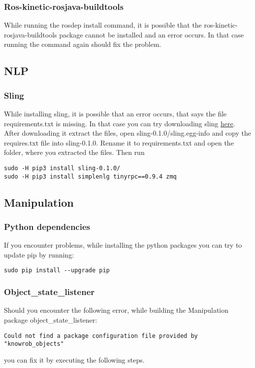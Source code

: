 \documentclass[main.tex]{subfiles}
\begin{document}
	\subsubsection{Ros-kinetic-rosjava-buildtools}
	While running the rosdep install command, it is possible that the ros-kinetic-rosjava-buildtools package cannot be installed and an error occurs. In that case running the command again should fix the problem.


	\subsection{NLP}
	\subsubsection{Sling}
	While installing sling, it is possible that an error occurs, that says the file requirements.txt is missing. In that case you can try downloading sling \href{https://pypi.org/project/sling/#files}{here}. After downloading it extract the files, open sling-0.1.0/sling.egg-info and copy the requires.txt file into sling-0.1.0. Rename it to requirements.txt and open the folder, where you extracted the files. Then run \\
	\begin{lstlisting}
sudo -H pip3 install sling-0.1.0/
sudo -H pip3 install simplenlg tinyrpc==0.9.4 zmq
\end{lstlisting}
	
	\subsection{Manipulation}
	\subsubsection{Python dependencies}
	If you encounter problems, while installing the python packages you can try to update pip by running:\\
	\begin{lstlisting}
sudo pip install --upgrade pip
\end{lstlisting}

	\subsubsection{Object\_state\_listener}	
	Should you encounter the following error, while building the Manipulation package object\_state\_listener:
	\begin{lstlisting}
Could not find a package configuration file provided by "knowrob_objects"
\end{lstlisting}
you can fix it by executing the following steps.\\
\\	
\end{document}
